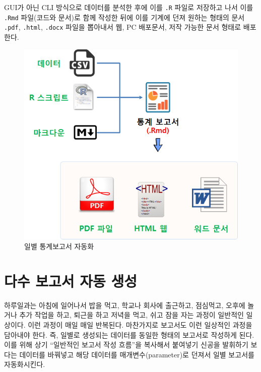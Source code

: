 \documentclass[
  letterpaper,
  chapter,a4paper,showtrims,openright,hidelinks]{oblivoir}
\begin{document}
GUI가 아닌 CLI 방식으로 데이터를 분석한 후에 이를 \texttt{.R} 파일로
저장하고 나서 이를 \texttt{.Rmd} 파일(코드와 문서)로 함께 작성한 뒤에
이를 기계에 던져 원하는 형태의 문서 \texttt{.pdf}, \texttt{.html},
\texttt{.docx} 파일을 뽑아내서 웹, PC 배포문서, 저작 가능한 문서 형태로
배포한다.

\begin{figure}

{\centering \includegraphics{images/report-single-automation.png}

}

\caption{일별 통계보고서 자동화}

\end{figure}

\hypertarget{uxb2e4uxc218-uxbcf4uxace0uxc11c-uxc790uxb3d9-uxc0dduxc131}{%
\section{다수 보고서 자동
생성}\label{uxb2e4uxc218-uxbcf4uxace0uxc11c-uxc790uxb3d9-uxc0dduxc131}}

하루일과는 아침에 일어나서 밥을 먹고, 학교나 회사에 출근하고, 점심먹고,
오후에 놀거나 추가 작업을 하고, 퇴근을 하고 저녁을 먹고, 쉬고 잠을 자는
과정이 일반적인 일상이다. 이런 과정이 매일 매일 반복된다. 마찬가지로
보고서도 이런 일상적인 과정을 담아내야 한다. 즉, 일별로 생성되는
데이터를 동일한 형태의 보고서로 작성하게 된다. 이를 위해 상기 ``일반적인
보고서 작성 흐름''을 복사해서 붙여넣기 신공을 발휘하기 보다는 데이터를
바꿔넣고 해당 데이터를 매개변수(parameter)로 던져서 일별 보고서를
자동화시킨다.
\end{document}
